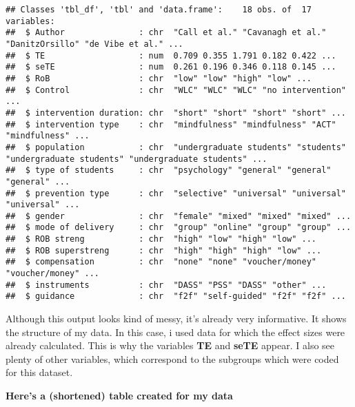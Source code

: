 \documentclass[]{book}
\theoremstyle{definition}
\theoremstyle{definition}
\theoremstyle{definition}
\theoremstyle{remark}
\begin{document}
\begin{verbatim}
## Classes 'tbl_df', 'tbl' and 'data.frame':    18 obs. of  17 variables:
##  $ Author               : chr  "Call et al." "Cavanagh et al." "DanitzOrsillo" "de Vibe et al." ...
##  $ TE                   : num  0.709 0.355 1.791 0.182 0.422 ...
##  $ seTE                 : num  0.261 0.196 0.346 0.118 0.145 ...
##  $ RoB                  : chr  "low" "low" "high" "low" ...
##  $ Control              : chr  "WLC" "WLC" "WLC" "no intervention" ...
##  $ intervention duration: chr  "short" "short" "short" "short" ...
##  $ intervention type    : chr  "mindfulness" "mindfulness" "ACT" "mindfulness" ...
##  $ population           : chr  "undergraduate students" "students" "undergraduate students" "undergraduate students" ...
##  $ type of students     : chr  "psychology" "general" "general" "general" ...
##  $ prevention type      : chr  "selective" "universal" "universal" "universal" ...
##  $ gender               : chr  "female" "mixed" "mixed" "mixed" ...
##  $ mode of delivery     : chr  "group" "online" "group" "group" ...
##  $ ROB streng           : chr  "high" "low" "high" "low" ...
##  $ ROB superstreng      : chr  "high" "high" "high" "low" ...
##  $ compensation         : chr  "none" "none" "voucher/money" "voucher/money" ...
##  $ instruments          : chr  "DASS" "PSS" "DASS" "other" ...
##  $ guidance             : chr  "f2f" "self-guided" "f2f" "f2f" ...
\end{verbatim}

Although this output looks kind of messy, it's already very informative.
It shows the structure of my data. In this case, i used data for which
the effect sizes were already calculated. This is why the variables
\textbf{TE} and \textbf{seTE} appear. I also see plenty of other
variables, which correspond to the subgroups which were coded for this
dataset.

\textbf{Here's a (shortened) table created for my data}
\end{document}
